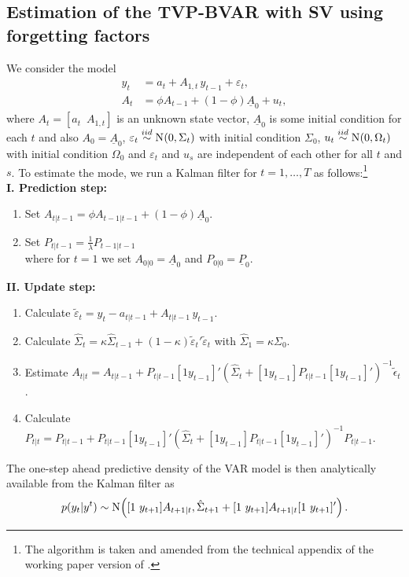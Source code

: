 \subsection{Estimation of the TVP-BVAR with SV using forgetting factors}
\label{app:est}
We consider the model
\begin{align}\label{eqn:Atvpvar1}
	y_t&=a_t+A_{1,t}\,y_{t-1}+\varepsilon_t,\\
	A_t&=\phi A_{t-1}+(1-\phi)\underline{A}_0+u_t,\label{eqn:Atvpvar2}
\end{align}
where $A_t=[a_t\,\,\, A_{1,t}]$ is an unknown state vector, $\underline{A}_0$ is some initial condition for each $t$ and also $A_0=\underline{A}_0$, $\varepsilon_t\stackrel{iid}{\sim}\No{0,\Sigma_t}$ with initial condition $\Sigma_0$, $u_t\stackrel{iid}{\sim}\No{0,\Omega_t}$ with initial condition $\Omega_0$ and $\varepsilon_t$ and $u_s$ are independent of each other for all $t$ and $s$. To estimate the mode, we run a Kalman filter for $t=1,\ldots,T$ as follows:\footnote{The algorithm is taken and amended from the technical appendix of the working paper version of \cite{koop2013}.}\\
\textbf{I. Prediction step:}
\begin{enumerate}
	\item Set $A_{t|t-1}=\phi A_{t-1|t-1}+(1-\phi)\underline{A}_0$.
	\item Set $P_{t|t-1}=\frac{1}{\lambda}P_{t-1|t-1}$\\
	where for $t=1$ we set $A_{0|0}=\underline{A}_0$ and $P_{0|0}=\underline{P}_0$.
\end{enumerate}
\textbf{II. Update step:}
\begin{enumerate}
	\item Calculate $\tilde{\varepsilon}_t=y_t-a_{t|t-1}+A_{t|t-1}\,y_{t-1}$.
	\item Calculate $\hat{\Sigma}_t=\kappa\hat{\Sigma}_{t-1}+(1-\kappa)\tilde{\varepsilon}_t'\tilde{\varepsilon}_t$ with $\hat{\Sigma}_1=\kappa\Sigma_0$.
	\item Estimate $A_{t|t}=A_{t|t-1}+P_{t|t-1}[1 y_{t-1}]'\left(\hat{\Sigma}_t+[1 y_{t-1}]P_{t|t-1}[1 y_{t-1}]'\right)^{-1}\tilde{\epsilon}_t$.
	\item Calculate $P_{t|t}=P_{t|t-1}+P_{t|t-1}[1 y_{t-1}]'\left(\hat{\Sigma}_t+[1 y_{t-1}]P_{t|t-1}[1 y_{t-1}]'\right)^{-1}P_{t|t-1}$.
\end{enumerate}
The one-step ahead predictive density of the VAR model is then analytically available from the Kalman filter as
\begin{equation}
p(y_t|y^t)\sim\No{[1\,\, y_{t+1}]A_{t+1|t},\hat{\Sigma}_{t+1}+[1\,\, y_{t+1}]A_{t+1|t}[1\,\, y_{t+1}]'}.
\end{equation}

